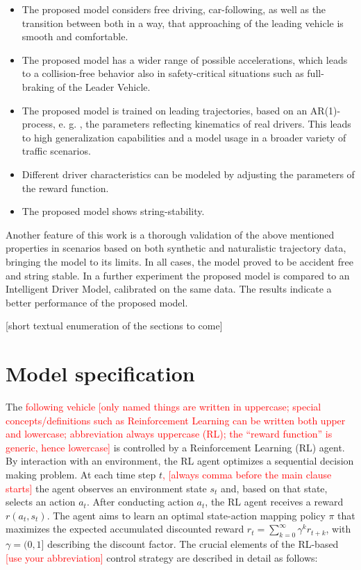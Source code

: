 \documentclass[review]{elsarticle}
\providecommand{\red}[1]{\textcolor{red}{#1}}
\providecommand{\martin}[1]{\red{#1}} %
\begin{document}
\begin{itemize}
	\item  The proposed model considers free driving, car-following, as well as the transition between both in a way, that approaching of the leading vehicle is smooth and comfortable.
	\item The proposed model has a wider range of possible accelerations, which leads to a collision-free behavior also in safety-critical situations such as full-braking of the Leader Vehicle.
	\item The proposed model is trained on leading trajectories, based on an AR(1)-process, e. g. \cite{HonerkampEngl}, the parameters reflecting kinematics of real drivers. This leads to high generalization capabilities and a model usage in a broader variety of traffic scenarios. 
	\item Different driver characteristics can be modeled by adjusting the parameters of the reward function.
	\item The proposed model shows string-stability.
	
\end{itemize}

Another feature of this work is a thorough validation of the above mentioned properties in scenarios based on both synthetic and naturalistic trajectory data, bringing the model to its limits. 
In all cases, the model proved to be accident free and string stable.
In a further experiment the proposed model is compared to an Intelligent Driver Model, calibrated on the same data. The results indicate a better performance of the proposed model.


[short textual enumeration of the sections to come]

\section{Model specification}
The \martin{following vehicle} \martin{[only named things are written
    in uppercase; special concepts/definitions such as Reinforcement Learning
    can be written both upper and lowercase; abbreviation always
    uppercase (RL); the
    ``reward function'' is generic, hence lowercase]} is controlled by a Reinforcement
Learning (RL) agent. By interaction with an environment, the RL agent
optimizes a sequential decision making problem. At each time step
$t$\martin{, [always comma before the main clause starts]} the agent observes an environment state $s_t$ and, based on that state, selects an action $a_t$. After conducting action $a_t$, the RL agent receives a reward $r(a_t,s_t)$. The agent aims to learn an optimal state-action mapping policy $\pi$ that maximizes the expected accumulated discounted reward $r_{t}=\sum_{k=0}^{\infty} \gamma^{k} r_{t+k}$, with $\gamma = (0,1]$ describing the discount factor. The crucial elements
of the RL-based \martin{[use your abbreviation]} control strategy are described
in detail as follows:
\end{document}
